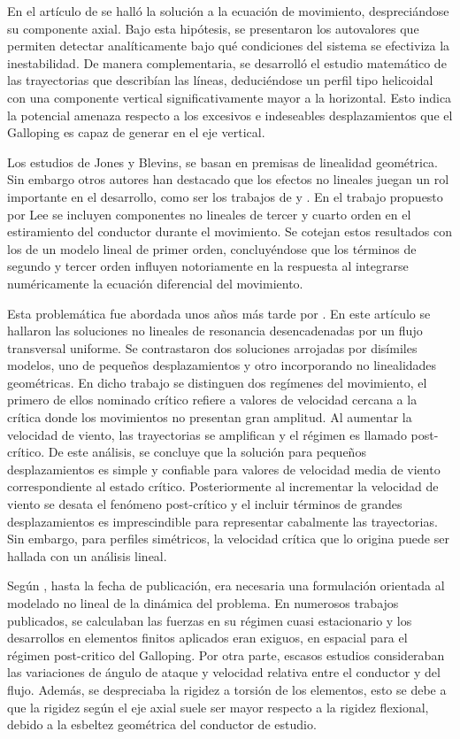 En el artículo de \cite{jones1992coupled} se halló la solución a la ecuación de movimiento, despreciándose su componente axial. Bajo esta hipótesis, se presentaron los autovalores que permiten detectar analíticamente bajo qué condiciones del sistema se efectiviza la inestabilidad. De manera complementaria, se desarrolló el estudio matemático de las trayectorias que describían las líneas, deduciéndose un perfil tipo helicoidal con una componente vertical significativamente mayor a la horizontal. Esto indica la potencial amenaza respecto a los excesivos e indeseables desplazamientos que el Galloping es capaz de generar en el eje vertical. 

Los estudios de Jones y Blevins, se basan en premisas de linealidad geométrica. Sin embargo otros autores han destacado que los efectos no lineales juegan un rol importante en el desarrollo, como ser los trabajos de \cite{luongo1984planar} y \cite{lee1992nonlinear}. En el trabajo propuesto por Lee se incluyen componentes no lineales de tercer y cuarto orden en el estiramiento del conductor durante el movimiento. Se cotejan estos resultados con los de un modelo lineal de primer orden, concluyéndose que los términos de segundo y tercer orden influyen notoriamente en la respuesta al integrarse numéricamente la ecuación diferencial del movimiento. 

Esta problemática fue abordada unos años más tarde por  \cite{luongo1998non}. En este artículo se hallaron las soluciones no lineales de resonancia desencadenadas por un flujo transversal uniforme. 
Se contrastaron dos soluciones arrojadas por disímiles modelos, uno de pequeños desplazamientos y otro incorporando no linealidades geométricas. En dicho trabajo se distinguen dos regímenes del movimiento, el primero de ellos nominado crítico refiere a valores de velocidad cercana a la crítica donde los movimientos no presentan gran amplitud. Al aumentar la velocidad de viento, las trayectorias se amplifican y el régimen es llamado post-crítico. De este análisis, se concluye que la solución para pequeños desplazamientos es simple y confiable para valores de velocidad media de viento correspondiente al estado crítico. Posteriormente al incrementar la velocidad de viento se desata el fenómeno post-crítico y el incluir términos de grandes desplazamientos es imprescindible para representar cabalmente las trayectorias. Sin embargo, para perfiles simétricos, la velocidad crítica que lo origina puede ser hallada con un análisis lineal.

Según \cite{luongo2007linear}, hasta la fecha de publicación, era necesaria una formulación orientada al modelado no lineal de la dinámica del problema. En numerosos trabajos publicados, se calculaban las fuerzas en su régimen cuasi estacionario y los desarrollos en elementos finitos aplicados eran exiguos, en espacial para el régimen post-critico del Galloping. Por otra parte, escasos estudios consideraban las variaciones de ángulo de ataque y velocidad relativa entre el conductor y del flujo. Además, se despreciaba la rigidez a torsión de los elementos, esto se debe a que la rigidez según el eje axial suele ser mayor respecto a la rigidez flexional, debido a la esbeltez geométrica del conductor de estudio.  

